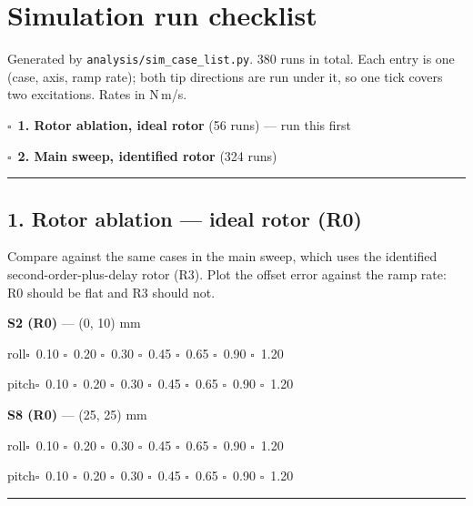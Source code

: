 \documentclass[10pt]{article}
\begin{document}
\section*{Simulation run checklist}
Generated by \texttt{analysis/sim\_case\_list.py}. 380 runs in total. Each entry is one (case, axis, ramp rate); both tip directions are run under it, so one tick covers two excitations. Rates in N\,m/s.\par\medskip
$\square$~\textbf{1. Rotor ablation, ideal rotor} (56 runs) --- run this first\par
$\square$~\textbf{2. Main sweep, identified rotor} (324 runs)\par\medskip
\hrule\medskip
\subsection*{1. Rotor ablation --- ideal rotor (R0)}
Compare against the same cases in the main sweep, which uses the identified second-order-plus-delay rotor (R3). Plot the offset error against the ramp rate: R0 should be flat and R3 should not.\par\medskip
\textbf{S2 (R0)} --- (0, 10) mm\par
\hspace*{6mm}roll\quad $\square$~0.10 \quad $\square$~0.20 \quad $\square$~0.30 \quad $\square$~0.45 \quad $\square$~0.65 \quad $\square$~0.90 \quad $\square$~1.20\par
\hspace*{6mm}pitch\quad $\square$~0.10 \quad $\square$~0.20 \quad $\square$~0.30 \quad $\square$~0.45 \quad $\square$~0.65 \quad $\square$~0.90 \quad $\square$~1.20\par
\medskip
\textbf{S8 (R0)} --- (25, 25) mm\par
\hspace*{6mm}roll\quad $\square$~0.10 \quad $\square$~0.20 \quad $\square$~0.30 \quad $\square$~0.45 \quad $\square$~0.65 \quad $\square$~0.90 \quad $\square$~1.20\par
\hspace*{6mm}pitch\quad $\square$~0.10 \quad $\square$~0.20 \quad $\square$~0.30 \quad $\square$~0.45 \quad $\square$~0.65 \quad $\square$~0.90 \quad $\square$~1.20\par
\medskip
\hrule\medskip
\end{document}

